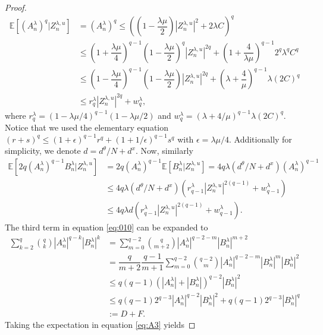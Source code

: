 \documentclass[10pt,a4paper]{amsart}
\begin{document}
\begin{proof}
\begin{align}
\mathbb{E}\left[(A_n^{\lambda})^q|Z_n^{\lambda,u}\right]&=(A_n^{\lambda})^{q}\leq \left(\left(1-\dfrac{\lambda\mu}{2}\right)|Z_n^{\lambda,u}|^2+2\lambda C\right)^q\nonumber\\
&\leq \left(1+\dfrac{\lambda \mu}{4}\right)^{q-1}\left(1-\dfrac{\lambda\mu}{2}\right)^q|Z_n^{\lambda,u}|^{2q}+\left(1+\dfrac{4}{\lambda\mu }\right)^{q-1}2^q{\lambda}^q C^q\nonumber\\
&\leq \left(1-\dfrac{\lambda\mu}{4}\right)^{q-1}\left(1-\dfrac{\lambda\mu}{2}\right)|Z_n^{\lambda,u}|^{2q}+\left(\lambda+\dfrac{4}{\mu }\right)^{q-1}\lambda (2C)^q\nonumber\\
&\leq r_q^{\lambda}|Z_n^{\lambda,u}|^{2q}+w_q^{\lambda},\label{eq:A1}
\end{align}
where $r_q^{\lambda}=(1-\lambda\mu/4)^{q-1}(1-\lambda\mu/2)$ and $w_q^{\lambda}=(\lambda+4/\mu)^{q-1}\lambda (2C)^q$. Notice that we used the elementary equation $(r+s)^q\leq(1+\epsilon)^{q-1}r^q+(1+1/\epsilon)^{q-1}s^q$ with $\epsilon=\lambda\mu/4$. Additionally for simplicity, we denote $d=d^{\theta}/N+d^x$. Now, similarly
\begin{align}
\mathbb{E}\left[2q(A_n^{\lambda})^{q-1}B^{\lambda}_n|Z_n^{\lambda,u}\right]&=2q(A_n^{\lambda})^{q-1}\mathbb{E}\left[B^{\lambda}_n|Z_n^{\lambda,u}\right]=4q\lambda\left(d^{\theta}/N+d^x\right)(A_n^{\lambda})^{q-1}\nonumber\\
&\leq 4q\lambda\left(d^{\theta}/N+d^x\right) \left(r_{q-1}^{\lambda}|Z_n^{\lambda,u}|^{2(q-1)}+w_{q-1}^{\lambda}\right)\nonumber\\
&\leq  4q\lambda d \left(r_{q-1}^{\lambda}|Z_n^{\lambda,u}|^{2(q-1)}+w_{q-1}^{\lambda}\right).\label{eq:A2}
\end{align}
The third term in equation \eqref{eq:010} can be expanded to
\begin{align}
\sum_{k=2}^q\binom{q}{k}|A_n^{\lambda}|^{q-k}|B^{\lambda}_n|^k&=\sum_{m=0}^{q-2}\binom{q}{m+2}|A_n^{\lambda}|^{q-2-m}|B^{\lambda}_n|^{m+2}\nonumber\\
&=\dfrac{q}{m+2}\dfrac{q-1}{m+1}\sum_{m=0}^{q-2}\binom{q-2}{m}|A_n^{\lambda}|^{q-2-m}|B^{\lambda}_n|^{m}|B^{\lambda}_n|^{2}\nonumber\\
&\leq q(q-1)\left(|A_n^{\lambda}|+|B_n^{\lambda}|\right)^{q-2}|B^{\lambda}_n|^2\nonumber\\
&\leq q(q-1)2^{q-3}|A_n^{\lambda}|^{q-2}|B_n^{\lambda}|^2+q(q-1)2^{q-3}|B_n^{\lambda}|^q\nonumber\\
&:=D+F.\label{eq:A3}
\end{align}
Taking the expectation in equation \eqref{eq:A3} yields

\end{proof}
\end{document}
